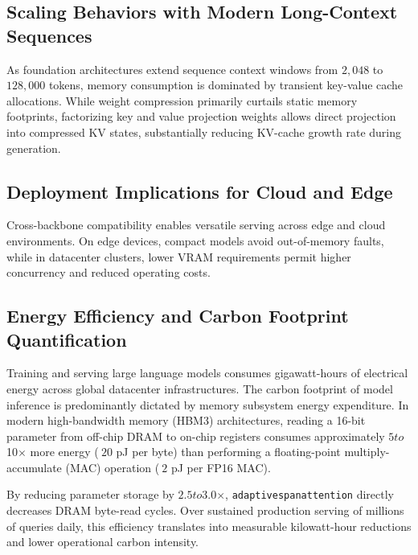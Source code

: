 \subsection{Scaling Behaviors with Modern Long-Context Sequences}
As foundation architectures extend sequence context windows from $2{,}048$ to $128{,}000$ tokens, memory consumption is dominated by transient key-value cache allocations. While weight compression primarily curtails static memory footprints, factorizing key and value projection weights allows direct projection into compressed KV states, substantially reducing KV-cache growth rate during generation.

\subsection{Deployment Implications for Cloud and Edge}
Cross-backbone compatibility enables versatile serving across edge and cloud environments. On edge devices, compact models avoid out-of-memory faults, while in datacenter clusters, lower VRAM requirements permit higher concurrency and reduced operating costs.

\subsection{Energy Efficiency and Carbon Footprint Quantification}
Training and serving large language models consumes gigawatt-hours of electrical energy across global datacenter infrastructures. The carbon footprint of model inference is predominantly dictated by memory subsystem energy expenditure. In modern high-bandwidth memory (HBM3) architectures, reading a 16-bit parameter from off-chip DRAM to on-chip registers consumes approximately $5$\times$ to $10$\times$ more energy ($~20$ pJ per byte) than performing a floating-point multiply-accumulate (MAC) operation ($~2$ pJ per FP16 MAC).

By reducing parameter storage by $2.5$\times$ to $3.0$\times$, \texttt{adaptivespanattention} directly decreases DRAM byte-read cycles. Over sustained production serving of millions of queries daily, this efficiency translates into measurable kilowatt-hour reductions and lower operational carbon intensity.
